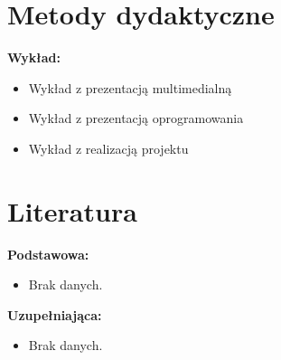 \documentclass[12pt, a4paper]{article}
\begin{document}
\section{Metody dydaktyczne}

\textbf{Wykład:}
\begin{itemize}
  \item Wykład z prezentacją multimedialną
  \item Wykład z prezentacją oprogramowania
  \item Wykład z realizacją projektu
\end{itemize}
\vspace{4pt}


\section{Literatura}

\textbf{Podstawowa:}
\begin{itemize}
  \item Brak danych.
\end{itemize}

\textbf{Uzupełniająca:}
\begin{itemize}
  \item Brak danych.
\end{itemize}
\end{document}

